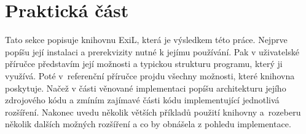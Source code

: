 \section{Praktická část}

Tato sekce popisuje knihovnu ExiL\footnotemark, která je výsledkem této práce.
Nejprve popíšu její instalaci a prerekvizity nutné k jejímu používání. Pak v
uživatelské příručce představím její možnosti a typickou strukturu programu,
který ji využívá.  Poté v~referenční příručce projdu všechny možnosti, které
knihovna poskytuje.  Načež v části věnované implementaci popíšu architekturu
jejího zdrojového kódu a zmíním zajímavé části kódu implementující jednotlivá
rozšíření.  Nakonec uvedu několik větších příkladů použití knihovny a~rozeberu
několik dalších možných rozšíření a co by obnášela z pohledu implementace.



\clearpage

\clearpage

% 
\clearpage


